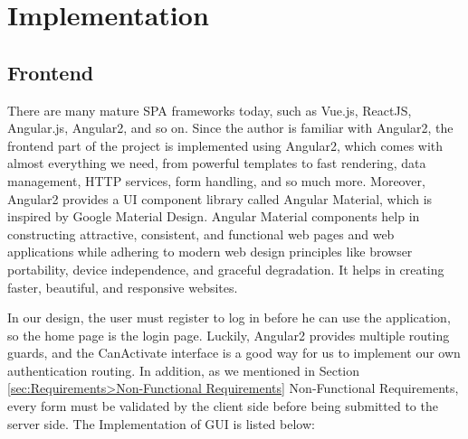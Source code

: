 \section{Implementation}
\label{sec:Implementation}

\subsection{Frontend}

There are many mature SPA frameworks today, such as Vue.js, ReactJS, Angular.js, Angular2, and so on. Since the author is familiar with Angular2, the frontend part of the project is implemented using Angular2, which comes with almost everything we need, from powerful templates to fast rendering, data management, HTTP services, form handling, and so much more. Moreover, Angular2 provides a UI component library called Angular Material,
which is inspired by Google Material Design. Angular Material components help in constructing attractive, consistent, and functional web pages and web applications while adhering to modern web design principles like browser portability, device independence, and graceful degradation. It helps in creating faster, beautiful, and responsive websites.

In our design, the user must register to log in before he can use the application, so the home page is the login page. Luckily, Angular2 provides multiple routing guards, and the CanActivate interface is a good way for us to implement our own authentication routing. In addition, as we mentioned in Section \ref{sec:Requirements>Non-Functional Requirements} Non-Functional Requirements, every form must be validated by the client side before being submitted to the server side. The Implementation of GUI is listed below:

